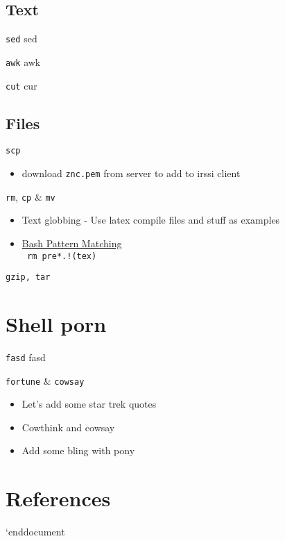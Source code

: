 \documentclass[11pt]{beamer}
\begin{document}
		\subsection{Text}
			\begin{frame}{ \texttt{sed}}
				sed
			\end{frame}
			\begin{frame}{ \texttt{awk}}
				awk
			\end{frame}
			\begin{frame}{ \texttt{cut}}
				cur
			\end{frame}
		\subsection{Files}
			\begin{frame}{ \texttt{scp}}
				\begin{itemize}
					\item download \texttt{znc.pem} from server to add to irssi client
				\end{itemize}			
			\end{frame}
			\begin{frame}{ \texttt{rm}, \texttt{cp} \& \texttt{mv}}
				\begin{itemize}
					\item Text globbing - Use latex compile files and stuff as examples
					\item \href{https://www.gnu.org/software/bash/manual/bashref.html#Pattern-Matching}{Bash Pattern Matching} \\
						\texttt{ rm pre*.!(tex) }
				\end{itemize}	
			\end{frame}
			\begin{frame}{ \texttt{gzip, tar}}
				
			\end{frame}

	\section{Shell porn}
		\begin{frame}{\texttt{fasd}}
			fasd
		\end{frame}
		\begin{frame}{\texttt{fortune} \& \texttt{cowsay}}
			\begin{itemize}
				\item Let's add some star trek quotes
				\item Cowthink and cowsay
				\item Add some bling with pony
			\end{itemize}
		\end{frame}


	\section*{References}
		\begin{frame}{References}
			\texttt{\}
		\end{frame}
`end{document}
\end{document}
